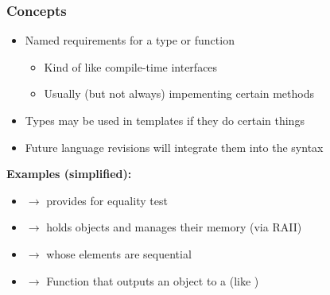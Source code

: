 \documentclass[glossy]{beamer}
\begin{document}
\begin{frame}[fragile=singleslide]
  \frametitle{Concepts}

  \begin{itemize}
    \item Named requirements for a type or function
    \begin{itemize}
      \item Kind of like compile-time interfaces
      \item Usually (but not always) impementing certain methods
    \end{itemize}
    \item Types may be used in templates if they do certain things
    \item Future language revisions will integrate them into the syntax
  \end{itemize}

  \textbf{Examples (simplified):}
  \begin{itemize}
    \item {} $\rightarrow$ provides  for equality test
    \item {} $\rightarrow$ holds objects and manages their memory (via RAII)
    \item {} $\rightarrow$  whose elements are sequential
    \item {} $\rightarrow$ Function that outputs an object to a  (like )
  \end{itemize}
\end{frame}
\end{document}
